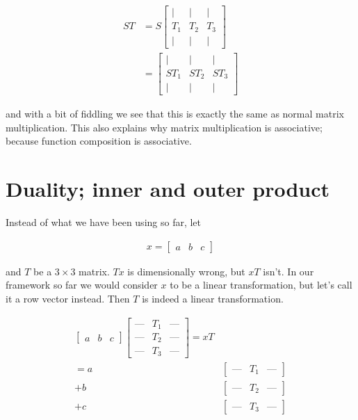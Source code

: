 \documentclass{article}
\begin{document}
\begin{align}
ST &= S
\begin{bmatrix}
\vert  & \vert & \vert \\
T_1 & T_2 & T_3 \\
\vert & \vert & \vert
\end{bmatrix} \\
&=
\begin{bmatrix}
\vert  & \vert & \vert \\
ST_1 & ST_2 & ST_3 \\
\vert & \vert & \vert
\end{bmatrix}
\end{align}

and with a bit of fiddling we see that this is exactly the same as normal matrix multiplication. This also explains why matrix multiplication is associative; because function composition is associative.

\section{Duality; inner and outer product}

Instead of what we have been using so far, let

\begin{align}
x
=
\begin{bmatrix}
a & b & c
\end{bmatrix} 
\end{align}

and $T$ be a $3 \times 3$ matrix. $Tx$ is dimensionally wrong, but $xT$ isn't. In our framework so far we would consider $x$ to be a linear transformation, but let's call it a row vector instead. Then $T$ is indeed a linear transformation.

\begin{align}
\begin{bmatrix}
a & b & c
\end{bmatrix}
\begin{bmatrix}
\mbox{---}  & T_1 & \mbox{---} \\
\mbox{---}  & T_2 & \mbox{---} \\
\mbox{---}  & T_3 & \mbox{---} 
\end{bmatrix}
= xT& \\
= a&
\begin{bmatrix}
\mbox{---}  & T_1 & \mbox{---}
\end{bmatrix} \\
+ b&
\begin{bmatrix}
\mbox{---}  & T_2 & \mbox{---}
\end{bmatrix} \\
+ c&
\begin{bmatrix}
\mbox{---}  & T_3 & \mbox{---}
\end{bmatrix}
\end{align}
\end{document}
